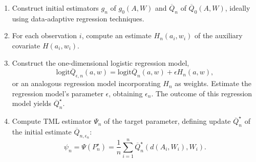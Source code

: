 \documentclass[
  12pt, krantz2,
]{krantz}
\providecommand{\tightlist}{%
  \setlength{\itemsep}{0pt}\setlength{\parskip}{0pt}}
\newcommand{\1}{\mathbbm{1}}
\theoremstyle{definition}
\theoremstyle{definition}
\theoremstyle{definition}
\theoremstyle{definition}
\theoremstyle{remark}
\begin{document}
\begin{enumerate}
\def\labelenumi{\arabic{enumi}.}
\tightlist
\item
  Construct initial estimators \(g_n\) of \(g_0(A, W)\) and \(\overline{Q}_n\) of
  \(\overline{Q}_0(A, W)\), ideally using data-adaptive regression techniques.
\item
  For each observation \(i\), compute an estimate \(H_n(a_i, w_i)\) of the
  auxiliary covariate \(H(a_i,w_i)\).
\item
  Construct the one-dimensional logistic regression model,
  \[ \text{logit}\overline{Q}_{\epsilon, n}(a, w) =
  \text{logit}\overline{Q}_n(a, w) + \epsilon H_n(a, w),\]
  or an analogous regression model incorporating \(H_n\) as weights. Estimate the
  regression model's parameter \(\epsilon\), obtaining \(\epsilon_n\). The outcome
  of this regression model yields \(\overline{Q}_n^{\star}\).
\item
  Compute TML estimator \(\Psi_n\) of the target parameter, defining update
  \(\overline{Q}_n^{\star}\) of the initial estimate
  \(\overline{Q}_{n, \epsilon_n}\):
  \begin{equation}
    \psi_n = \Psi(P_n^{\star}) = \frac{1}{n} \sum_{i = 1}^n
    \overline{Q}_n^{\star}(d(A_i, W_i), W_i).
    \label{eq:tmle}
  \end{equation}
\end{enumerate}
\end{document}
